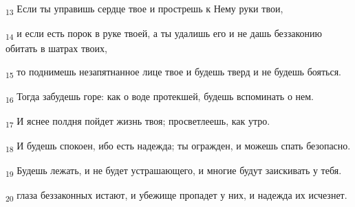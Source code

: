 \begin{tcolorbox}
\textsubscript{13} Если ты управишь сердце твое и прострешь к Нему руки твои,
\end{tcolorbox}
\begin{tcolorbox}
\textsubscript{14} и если есть порок в руке твоей, а ты удалишь его и не дашь беззаконию обитать в шатрах твоих,
\end{tcolorbox}
\begin{tcolorbox}
\textsubscript{15} то поднимешь незапятнанное лице твое и будешь тверд и не будешь бояться.
\end{tcolorbox}
\begin{tcolorbox}
\textsubscript{16} Тогда забудешь горе: как о воде протекшей, будешь вспоминать о нем.
\end{tcolorbox}
\begin{tcolorbox}
\textsubscript{17} И яснее полдня пойдет жизнь твоя; просветлеешь, как утро.
\end{tcolorbox}
\begin{tcolorbox}
\textsubscript{18} И будешь спокоен, ибо есть надежда; ты огражден, и можешь спать безопасно.
\end{tcolorbox}
\begin{tcolorbox}
\textsubscript{19} Будешь лежать, и не будет устрашающего, и многие будут заискивать у тебя.
\end{tcolorbox}
\begin{tcolorbox}
\textsubscript{20} глаза беззаконных истают, и убежище пропадет у них, и надежда их исчезнет.
\end{tcolorbox}
